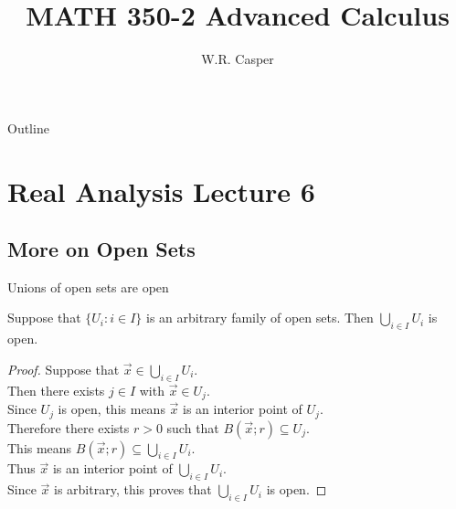 \documentclass{beamer}
\title{MATH 350-2 Advanced Calculus}
\subtitle
{} %
\author[W.R. Casper] %
{W.R. Casper}
\institute[California State University Fullerton] %
{
  Department of Mathematics\\
  California State University Fullerton}
\begin{document}
\begin{frame}
  \titlepage
\end{frame}

\begin{frame}{Outline}
  \tableofcontents
\end{frame}



\section{Real Analysis Lecture 6}
\subsection{More on Open Sets}

\begin{frame}{Unions of open sets are open}
\begin{thm}
Suppose that $\{U_i: i\in I\}$ is an arbitrary family of open sets.
Then $\bigcup_{i\in I} U_i$ is open.
\end{thm}
\pause
\begin{proof}
\pause
Suppose that $\vec x\in \bigcup_{i\in I} U_i$.\\
\pause
Then there exists $j\in I$ with $\vec x\in U_j$.\\
\pause
Since $U_j$ is open, this means $\vec x$ is an interior point of $U_j$.\\
\pause
Therefore there exists $r>0$ such that $B(\vec x; r)\subseteq U_j$.\\
\pause
This means $B(\vec x; r)\subseteq \bigcup_{i\in I} U_i$.\\
\pause
Thus $\vec x$ is an interior point of $\bigcup_{i\in I} U_i$.\\
\pause
Since $\vec x$ is arbitrary, this proves that $\bigcup_{i\in I} U_i$ is open.
\end{proof}
\end{frame}
\end{document}
